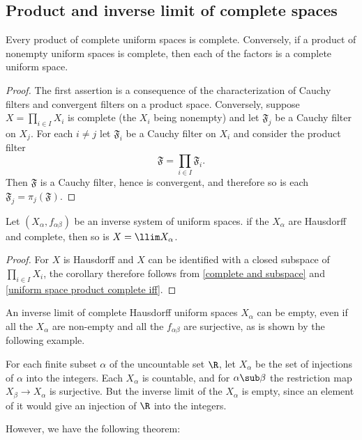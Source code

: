 \subsection{Product and inverse limit of complete spaces}
\begin{proposition}\label{uniform space product complete iff}
Every product of complete uniform spaces is complete. Conversely, if a product of nonempty uniform spaces is complete, then each of the factors is a complete uniform space.
\end{proposition}
\begin{proof}
The first assertion is a consequence of the characterization of Cauchy filters and convergent filters on a product space. Conversely, suppose $X=\prod_{i\in I}X_i$ is complete (the $X_i$ being nonempty) and let $\mathfrak{F}_j$ be a Cauchy filter on $X_j$. For each $i\neq j$ let $\mathfrak{F}_i$ be a Cauchy filter on $X_i$ and consider the product filter
\[\mathfrak{F}=\prod_{i\in I}\mathfrak{F}_i.\]
Then $\mathfrak{F}$ is a Cauchy filter, hence is convergent, and therefore so is each $\mathfrak{F}_j=\pi_j(\mathfrak{F})$.
\end{proof}
\begin{corollary}\label{uniform space inverse limit of complete is complete}
Let $(X_\alpha,f_{\alpha\beta})$ be an inverse system of uniform spaces. if the $X_\alpha$ are Hausdorff and complete, then so is $X=\llim X_\alpha$.
\end{corollary}
\begin{proof}
For $X$ is Hausdorff and $X$ can be identified with a closed subspace of $\prod_{i\in I}X_i$, the corollary therefore follows from \cref{complete and subspace} and \cref{uniform space product complete iff}.
\end{proof}
An inverse limit of complete Hausdorff uniform spaces $X_\alpha$ can be empty, even if all the $X_\alpha$ are non-empty and all the $f_{\alpha\beta}$ are surjective, as is shown by the following example.
\begin{example}
For each finite subset $\alpha$ of the uncountable set $\R$, let $X_\alpha$ be the set of injections of $\alpha$ into the integers. Each $X_\alpha$ is countable, and for $\alpha\sub\beta$ the restriction map $X_\beta\to X_\alpha$ is surjective. But the inverse limit of the $X_\alpha$ is empty, since an element of it would give an injection of $\R$ into the integers.
\end{example}
However, we have the following theorem:
